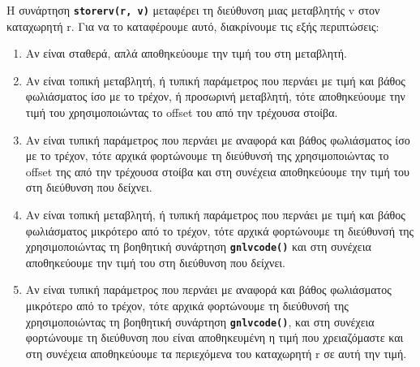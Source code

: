 \documentclass[a4paper]{article}
\let\OldTexttt\texttt
\renewcommand{\texttt}[1]{\OldTexttt{\textbf{#1}}}
\begin{document}
Η συνάρτηση \texttt{storerv(r, v)} μεταφέρει τη διεύθυνση μιας μεταβλητής v στον
καταχωρητή r. Για να το καταφέρουμε αυτό, διακρίνουμε τις εξής περιπτώσεις:
\begin{enumerate}
\item Αν είναι σταθερά, απλά αποθηκεύουμε την τιμή του στη μεταβλητή.
\item Αν είναι τοπική μεταβλητή, ή τυπική παράμετρος που περνάει με τιμή και βάθος 
φωλιάσματος ίσο με το τρέχον, ή προσωρινή μεταβλητή, τότε αποθηκεύουμε την
τιμή του χρησιμοποιώντας το offset του από την τρέχουσα στοίβα.
\item Αν είναι τυπική παράμετρος που περνάει με αναφορά και βάθος φωλιάσματος
ίσο με το τρέχον, τότε αρχικά φορτώνουμε τη διεύθυνσή της χρησιμοποιώντας
το offset της από την τρέχουσα στοίβα και στη συνέχεια αποθηκεύουμε την τιμή
του στη διεύθυνση που δείχνει.
\item Αν είναι τοπική μεταβλητή, ή τυπική παράμετρος που περνάει με τιμή και
βάθος φωλιάσματος μικρότερο από το τρέχον, τότε αρχικά φορτώνουμε τη
διεύθυνσή της χρησιμοποιώντας τη βοηθητική συνάρτηση \texttt{gnlvcode()}
και στη συνέχεια αποθηκεύουμε την τιμή του στη διεύθυνση που δείχνει.
\item Αν είναι τυπική παράμετρος που περνάει με αναφορά και βάθος φωλιάσματος
μικρότερο από το τρέχον, τότε αρχικά φορτώνουμε τη
διεύθυνσή της χρησιμοποιώντας τη βοηθητική συνάρτηση \texttt{gnlvcode()},
και στη συνέχεια φορτώνουμε τη διεύθυνση που είναι αποθηκευμένη η τιμή που
χρειαζόμαστε και στη συνέχεια αποθηκεύουμε τα περιεχόμενα του καταχωρητή r
σε αυτή την τιμή.
\end{enumerate}
\end{document}
